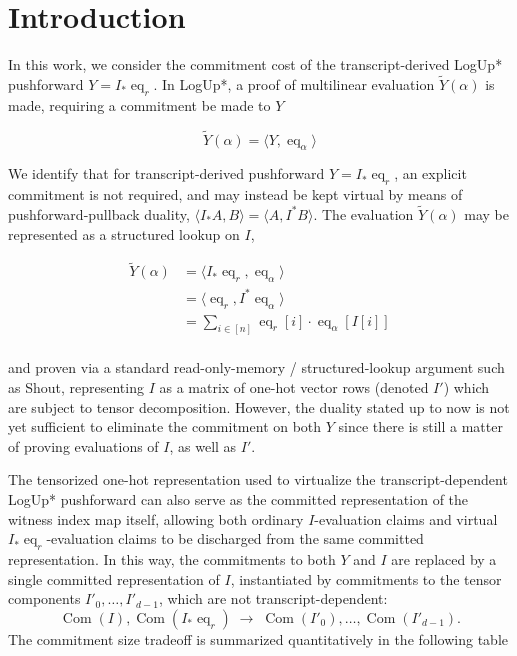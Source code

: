 \section{Introduction}

In this work, we consider the commitment cost of the transcript-derived LogUp* pushforward 
\(Y=I_*\operatorname{eq}_r\). In LogUp*, a proof of multilinear evaluation \(\widetilde{Y}(\alpha)\) 
is made, requiring a commitment be made to \(Y\) 

\[
\widetilde{Y}(\alpha) = \langle Y, \operatorname{eq}_\alpha \rangle
\]

We identify that for transcript-derived pushforward \(Y=I_*\operatorname{eq}_r\), an explicit commitment is 
not required, and may instead be kept virtual by means of pushforward-pullback duality,
\(\langle I_{*}A, B\rangle = \langle A, I^{*}B\rangle\). The evaluation \(\widetilde{Y}(\alpha)\) may 
be represented as a structured lookup on \(I\), 

\[
\begin{aligned}
\widetilde{Y}(\alpha) 
&= \langle I_*\operatorname{eq}_r, \operatorname{eq}_\alpha \rangle \\
&= \langle \operatorname{eq}_r, I^* \operatorname{eq}_\alpha \rangle \\
&= \sum_{i \in [n]} \operatorname{eq}_r[i] \cdot \operatorname{eq}_\alpha[I[i]] \\
\end{aligned}
\]

and proven via a standard read-only-memory / structured-lookup argument such as Shout, representing 
$I$ as a matrix of one-hot vector rows (denoted $I'$) which are subject to tensor decomposition. However, 
the duality stated up to now is not yet sufficient to eliminate the commitment on both $Y$ since there is 
still a matter of proving evaluations of $I$, as well as $I'$.

The tensorized one-hot representation used to virtualize the transcript-dependent LogUp* pushforward 
can also serve as the committed representation of the witness index map itself, allowing both ordinary 
$I$-evaluation claims and virtual $I_*\operatorname{eq}_r$-evaluation claims to be discharged from the 
same committed representation. In this way, the commitments to both $Y$ and $I$ are replaced by a single 
committed representation of $I$, instantiated by commitments to the tensor components 
$I'_0,\ldots,I'_{d-1}$, which are not transcript-dependent:
\[
\operatorname{Com}(I),\operatorname{Com}(I_*\operatorname{eq}_r)
\;\longrightarrow\;
\operatorname{Com}(I'_0),\ldots,\operatorname{Com}(I'_{d-1}).
\]
The commitment size tradeoff is summarized quantitatively in the following table


